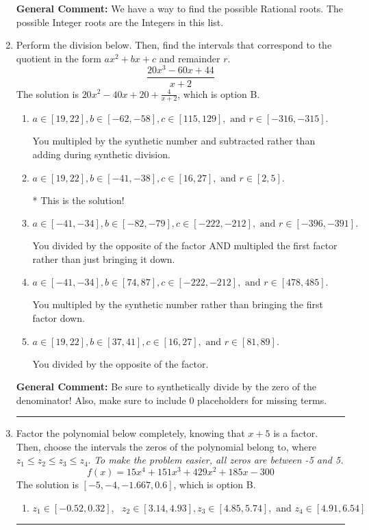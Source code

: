 \documentclass{extbook}[14pt]
\newcommand{\litem}[1]{\item #1

\rule{\textwidth}{0.4pt}}
\begin{document}
\begin{enumerate}
{\textbf{General Comment:} We have a way to find the possible Rational roots. The possible Integer roots are the Integers in this list.
}
\litem{
Perform the division below. Then, find the intervals that correspond to the quotient in the form $ax^2+bx+c$ and remainder $r$.
\[ \frac{20x^{3} -60 x + 44}{x + 2} \]The solution is \( 20x^{2} -40 x + 20 + \frac{4}{x + 2} \), which is option B.\begin{enumerate}[label=\Alph*.]
\item \( a \in [19, 22], b \in [-62, -58], c \in [115, 129], \text{ and } r \in [-316, -315]. \)

 You multipled by the synthetic number and subtracted rather than adding during synthetic division.
\item \( a \in [19, 22], b \in [-41, -38], c \in [16, 27], \text{ and } r \in [2, 5]. \)

* This is the solution!
\item \( a \in [-41, -34], b \in [-82, -79], c \in [-222, -212], \text{ and } r \in [-396, -391]. \)

 You divided by the opposite of the factor AND multipled the first factor rather than just bringing it down.
\item \( a \in [-41, -34], b \in [74, 87], c \in [-222, -212], \text{ and } r \in [478, 485]. \)

 You multipled by the synthetic number rather than bringing the first factor down.
\item \( a \in [19, 22], b \in [37, 41], c \in [16, 27], \text{ and } r \in [81, 89]. \)

 You divided by the opposite of the factor.
\end{enumerate}

\textbf{General Comment:} Be sure to synthetically divide by the zero of the denominator! Also, make sure to include 0 placeholders for missing terms.
}
\litem{
Factor the polynomial below completely, knowing that $x + 5$ is a factor. Then, choose the intervals the zeros of the polynomial belong to, where $z_1 \leq z_2 \leq z_3 \leq z_4$. \textit{To make the problem easier, all zeros are between -5 and 5.}
\[ f(x) = 15x^{4} +151 x^{3} +429 x^{2} +185 x -300 \]The solution is \( [-5, -4, -1.667, 0.6] \), which is option B.\begin{enumerate}[label=\Alph*.]
\item \( z_1 \in [-0.52, 0.32], \text{   }  z_2 \in [3.14, 4.93], z_3 \in [4.85, 5.74], \text{   and   } z_4 \in [4.91, 6.54] \)


\end{enumerate}}
\end{enumerate}
\end{document}
